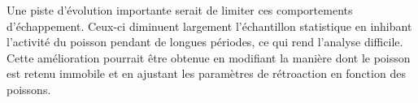 Une piste d'évolution importante serait de limiter ces comportements d'échappement. 
Ceux-ci diminuent largement l'échantillon statistique en inhibant l'activité du poisson pendant de longues périodes, ce qui rend l'analyse difficile. Cette amélioration pourrait être obtenue en modifiant la manière dont le poisson est retenu immobile et en ajustant les paramètres de rétroaction en fonction des poissons. 


